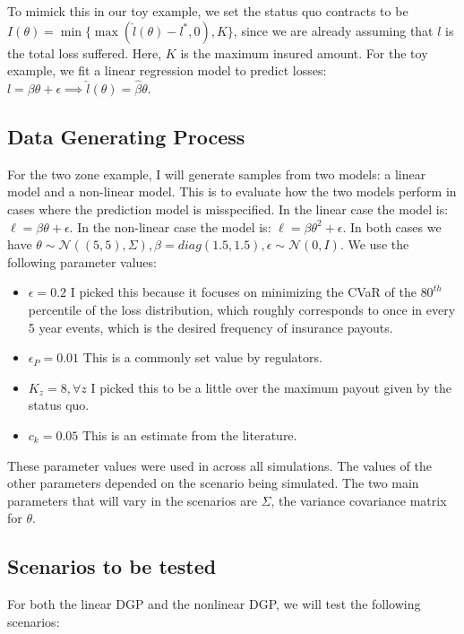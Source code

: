 \documentclass[11pt]{article}
\begin{document}
  To mimick this in our toy example, we set the status quo contracts to be $I(\theta) = \min \{ \max(\hat{l}(\theta)-l^*,0), K\}$, since we are already assuming that $l$ is the total loss suffered. Here, $K$ is the maximum insured amount. For the toy example, we fit a linear regression model to predict losses: $l = \beta \theta + \epsilon \implies \hat{l}(\theta) = \hat{\beta}\theta$.

  \subsection{Data Generating Process}  
    For the two zone example, I will generate samples from two models: a linear model and a non-linear model. This is to evaluate how the two models perform in cases where the prediction model is misspecified. In the linear case the model is: $\ell = \beta \theta + \epsilon$. In the non-linear case the model is: $\ell = \beta \theta^2 + \epsilon$. In both cases we have $\theta \sim \mathcal{N}((5,5),\Sigma), \beta = diag(1.5,1.5), \epsilon \sim \mathcal{N}(0,I)$. We use the following parameter values: 

    \begin{itemize}
        \item $\epsilon=0.2$ I picked this because it focuses on minimizing the CVaR of the $80^{th}$ percentile of the loss distribution, which roughly corresponds to once in every 5 year events, which is the desired frequency of insurance payouts.  
        \item $\epsilon_P=0.01$ This is a commonly set value by regulators.
        \item $K_z = 8, \forall z$ I picked this to be a little over the maximum payout given by the status quo. 
        \item $c_k=0.05$ This is an estimate from the literature. 
    \end{itemize}

    These parameter values were used in across all simulations. The values of the other parameters depended on the scenario being simulated. The two main parameters that will vary in the scenarios are $\Sigma$, the variance covariance matrix for $\theta$. 

  \subsection{Scenarios to be tested}
    For both the linear DGP and the nonlinear DGP, we will test the following scenarios: 
\end{document}
